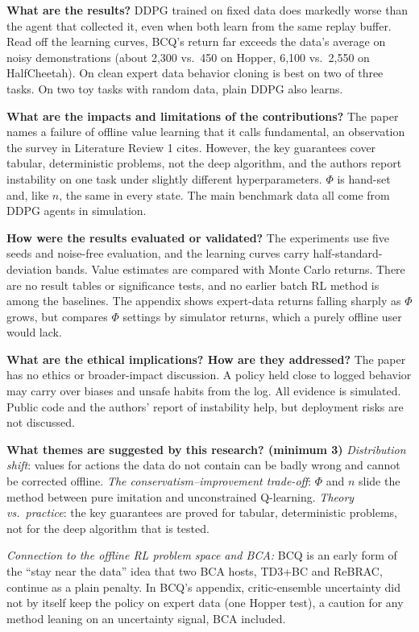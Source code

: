 \documentclass[11pt]{article}
\newcommand{\q}[2]{\item \textbf{#1} #2}
\newcommand{\tiein}[1]{\par\smallskip\noindent\emph{Connection to the offline RL problem space and BCA:} #1\par\medskip}
\begin{document}
\begin{qna}
\q{What are the results?}
DDPG trained on fixed data does markedly worse than the agent that collected it, even when both learn from the same replay buffer. Read off the learning curves, BCQ's return far exceeds the data's average on noisy demonstrations (about 2,300 vs.\ 450 on Hopper, 6,100 vs.\ 2,550 on HalfCheetah). On clean expert data behavior cloning is best on two of three tasks. On two toy tasks with random data, plain DDPG also learns.

\q{What are the impacts and limitations of the contributions?}
The paper names a failure of offline value learning that it calls fundamental, an observation the survey in Literature Review 1 cites. However, the key guarantees cover tabular, deterministic problems, not the deep algorithm, and the authors report instability on one task under slightly different hyperparameters. $\Phi$ is hand-set and, like $n$, the same in every state. The main benchmark data all come from DDPG agents in simulation.

\q{How were the results evaluated or validated?}
The experiments use five seeds and noise-free evaluation, and the learning curves carry half-standard-deviation bands. Value estimates are compared with Monte Carlo returns. There are no result tables or significance tests, and no earlier batch RL method is among the baselines. The appendix shows expert-data returns falling sharply as $\Phi$ grows, but compares $\Phi$ settings by simulator returns, which a purely offline user would lack.

\q{What are the ethical implications? How are they addressed?}
The paper has no ethics or broader-impact discussion. A policy held close to logged behavior may carry over biases and unsafe habits from the log. All evidence is simulated. Public code and the authors' report of instability help, but deployment risks are not discussed.

\q{What themes are suggested by this research? (minimum 3)}
\emph{Distribution shift}: values for actions the data do not contain can be badly wrong and cannot be corrected offline. \emph{The conservatism--improvement trade-off}: $\Phi$ and $n$ slide the method between pure imitation and unconstrained Q-learning. \emph{Theory vs.\ practice}: the key guarantees are proved for tabular, deterministic problems, not for the deep algorithm that is tested.

\end{qna}
\tiein{BCQ is an early form of the ``stay near the data'' idea that two BCA hosts, TD3+BC and ReBRAC, continue as a plain penalty. In BCQ's appendix, critic-ensemble uncertainty did not by itself keep the policy on expert data (one Hopper test), a caution for any method leaning on an uncertainty signal, BCA included.}
\end{document}
